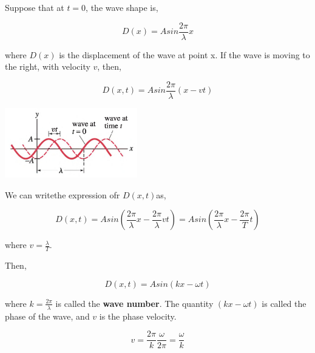 \documentclass[]{beamer}
\begin{document}
\begin{frame}
\pause

Suppose that at $t=0$, the wave shape is,

\pause
\begin{equation}
D(x)=Asin\frac{2\pi}{\lambda}x
\end{equation}

\pause

where $D(x)$ is the displacement of the wave at point x. If the wave is moving to the right, with velocity $v$, then,

\pause

\begin{equation}
D(x,t)=Asin\frac{2\pi}{\lambda}(x-vt)
\end{equation}

\pause

 \begin{center}
  \includegraphics[height=1.2in]{images4/9.jpg}
\end{center}



  \end{frame}

\begin{frame}


We can writethe expression ofr $D(x,t) $as,

\pause

\begin{equation}
D(x,t)=Asin(\frac{2\pi}{\lambda}x-\frac{2\pi}{\lambda}vt)=Asin(\frac{2\pi}{\lambda}x-\frac{2\pi}{T}t)
\end{equation}

\pause

where $v=\frac{\lambda}{T}$.

\pause

Then,

\pause

\begin{equation}
D(x,t)=Asin(kx-\omega t)
\end{equation}

\pause


where $k=\frac{2\pi}{\lambda}$ is called the \textbf{wave number}. The quantity $(kx-\omega t)$ is called the phase of the wave, and $v$ is the phase velocity.

\pause
\begin{equation}
v=\frac{2\pi}{k}\frac{\omega}{2\pi}=\frac{\omega}{k}
\end{equation}

  \end{frame}
\end{document}
